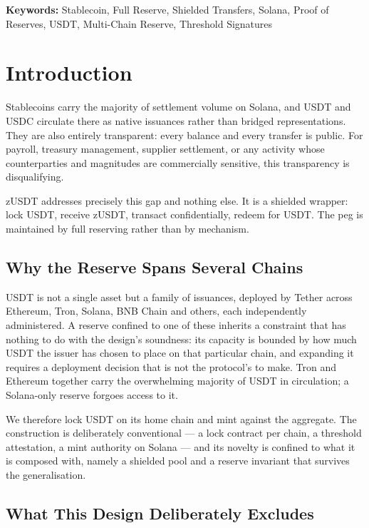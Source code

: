 \documentclass[11pt,a4paper]{article}
\begin{document}
\noindent\textbf{Keywords:} Stablecoin, Full Reserve, Shielded Transfers, Solana, Proof of Reserves, USDT, Multi-Chain Reserve, Threshold Signatures

\tableofcontents
\newpage

\section{Introduction}

Stablecoins carry the majority of settlement volume on Solana, and USDT and USDC circulate there as native issuances rather than bridged representations. They are also entirely transparent: every balance and every transfer is public. For payroll, treasury management, supplier settlement, or any activity whose counterparties and magnitudes are commercially sensitive, this transparency is disqualifying.

zUSDT addresses precisely this gap and nothing else. It is a shielded wrapper: lock USDT, receive zUSDT, transact confidentially, redeem for USDT. The peg is maintained by full reserving rather than by mechanism.

\subsection{Why the Reserve Spans Several Chains}

USDT is not a single asset but a family of issuances, deployed by Tether across Ethereum, Tron, Solana, BNB Chain and others, each independently administered. A reserve confined to one of these inherits a constraint that has nothing to do with the design's soundness: its capacity is bounded by how much USDT the issuer has chosen to place on that particular chain, and expanding it requires a deployment decision that is not the protocol's to make. Tron and Ethereum together carry the overwhelming majority of USDT in circulation; a Solana-only reserve forgoes access to it.

We therefore lock USDT on its home chain and mint against the aggregate. The construction is deliberately conventional --- a lock contract per chain, a threshold attestation, a mint authority on Solana --- and its novelty is confined to what it is composed with, namely a shielded pool and a reserve invariant that survives the generalisation.

\subsection{What This Design Deliberately Excludes}
\end{document}
